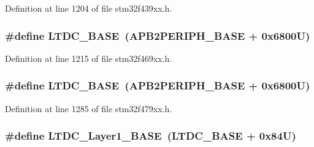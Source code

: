 Definition at line 1204 of file stm32f439xx.\+h.

\subsubsection[{\texorpdfstring{L\+T\+D\+C\+\_\+\+B\+A\+SE}{LTDC_BASE}}]{\setlength{\rightskip}{0pt plus 5cm}\#define L\+T\+D\+C\+\_\+\+B\+A\+SE~({\bf A\+P\+B2\+P\+E\+R\+I\+P\+H\+\_\+\+B\+A\+SE} + 0x6800\+U)}\hypertarget{group___peripheral__memory__map_gac6e45c39fafa3e82cdedbf447b461704}{}\label{group___peripheral__memory__map_gac6e45c39fafa3e82cdedbf447b461704}


Definition at line 1215 of file stm32f469xx.\+h.

\subsubsection[{\texorpdfstring{L\+T\+D\+C\+\_\+\+B\+A\+SE}{LTDC_BASE}}]{\setlength{\rightskip}{0pt plus 5cm}\#define L\+T\+D\+C\+\_\+\+B\+A\+SE~({\bf A\+P\+B2\+P\+E\+R\+I\+P\+H\+\_\+\+B\+A\+SE} + 0x6800\+U)}\hypertarget{group___peripheral__memory__map_gac6e45c39fafa3e82cdedbf447b461704}{}\label{group___peripheral__memory__map_gac6e45c39fafa3e82cdedbf447b461704}


Definition at line 1285 of file stm32f479xx.\+h.

\subsubsection[{\texorpdfstring{L\+T\+D\+C\+\_\+\+Layer1\+\_\+\+B\+A\+SE}{LTDC_Layer1_BASE}}]{\setlength{\rightskip}{0pt plus 5cm}\#define L\+T\+D\+C\+\_\+\+Layer1\+\_\+\+B\+A\+SE~({\bf L\+T\+D\+C\+\_\+\+B\+A\+SE} + 0x84\+U)}\hypertarget{group___peripheral__memory__map_ga81a2641d0a8e698f32b160b2d20d070b}{}\label{group___peripheral__memory__map_ga81a2641d0a8e698f32b160b2d20d070b}


